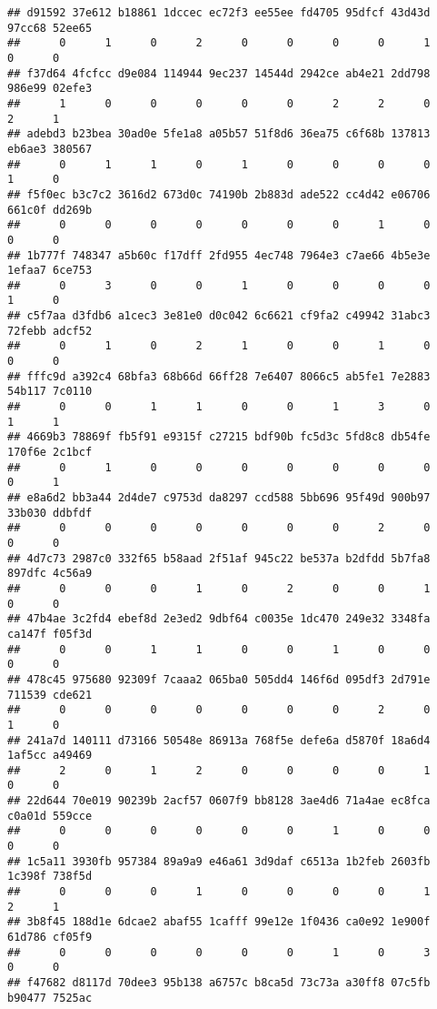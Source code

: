 \documentclass[
]{article}
\begin{document}
\begin{verbatim}
## d91592 37e612 b18861 1dccec ec72f3 ee55ee fd4705 95dfcf 43d43d 97cc68 52ee65 
##      0      1      0      2      0      0      0      0      1      0      0 
## f37d64 4fcfcc d9e084 114944 9ec237 14544d 2942ce ab4e21 2dd798 986e99 02efe3 
##      1      0      0      0      0      0      2      2      0      2      1 
## adebd3 b23bea 30ad0e 5fe1a8 a05b57 51f8d6 36ea75 c6f68b 137813 eb6ae3 380567 
##      0      1      1      0      1      0      0      0      0      1      0 
## f5f0ec b3c7c2 3616d2 673d0c 74190b 2b883d ade522 cc4d42 e06706 661c0f dd269b 
##      0      0      0      0      0      0      0      1      0      0      0 
## 1b777f 748347 a5b60c f17dff 2fd955 4ec748 7964e3 c7ae66 4b5e3e 1efaa7 6ce753 
##      0      3      0      0      1      0      0      0      0      1      0 
## c5f7aa d3fdb6 a1cec3 3e81e0 d0c042 6c6621 cf9fa2 c49942 31abc3 72febb adcf52 
##      0      1      0      2      1      0      0      1      0      0      0 
## fffc9d a392c4 68bfa3 68b66d 66ff28 7e6407 8066c5 ab5fe1 7e2883 54b117 7c0110 
##      0      0      1      1      0      0      1      3      0      1      1 
## 4669b3 78869f fb5f91 e9315f c27215 bdf90b fc5d3c 5fd8c8 db54fe 170f6e 2c1bcf 
##      0      1      0      0      0      0      0      0      0      0      1 
## e8a6d2 bb3a44 2d4de7 c9753d da8297 ccd588 5bb696 95f49d 900b97 33b030 ddbfdf 
##      0      0      0      0      0      0      0      2      0      0      0 
## 4d7c73 2987c0 332f65 b58aad 2f51af 945c22 be537a b2dfdd 5b7fa8 897dfc 4c56a9 
##      0      0      0      1      0      2      0      0      1      0      0 
## 47b4ae 3c2fd4 ebef8d 2e3ed2 9dbf64 c0035e 1dc470 249e32 3348fa ca147f f05f3d 
##      0      0      1      1      0      0      1      0      0      0      0 
## 478c45 975680 92309f 7caaa2 065ba0 505dd4 146f6d 095df3 2d791e 711539 cde621 
##      0      0      0      0      0      0      0      2      0      1      0 
## 241a7d 140111 d73166 50548e 86913a 768f5e defe6a d5870f 18a6d4 1af5cc a49469 
##      2      0      1      2      0      0      0      0      1      0      0 
## 22d644 70e019 90239b 2acf57 0607f9 bb8128 3ae4d6 71a4ae ec8fca c0a01d 559cce 
##      0      0      0      0      0      0      1      0      0      0      0 
## 1c5a11 3930fb 957384 89a9a9 e46a61 3d9daf c6513a 1b2feb 2603fb 1c398f 738f5d 
##      0      0      0      1      0      0      0      0      1      2      1 
## 3b8f45 188d1e 6dcae2 abaf55 1cafff 99e12e 1f0436 ca0e92 1e900f 61d786 cf05f9 
##      0      0      0      0      0      0      1      0      3      0      0 
## f47682 d8117d 70dee3 95b138 a6757c b8ca5d 73c73a a30ff8 07c5fb b90477 7525ac 

\end{verbatim}
\end{document}
